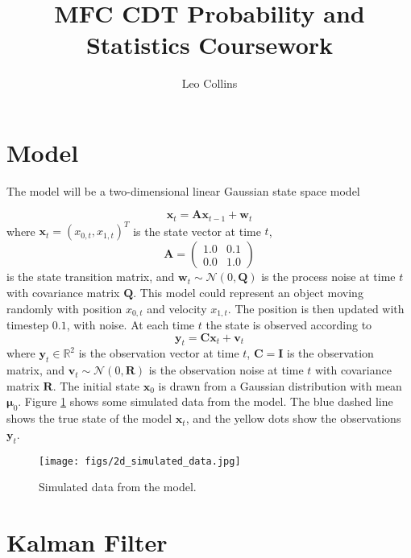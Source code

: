 \documentclass[12pt]{article}
\title{MFC CDT Probability and Statistics Coursework}
\author{Leo Collins}
\begin{document}
\maketitle

\section{Model}

The model will be a two-dimensional linear Gaussian state space model

\begin{equation}
    \mathbf{x}_{t} = \mathbf{A} \mathbf{x}_{t-1} + \mathbf{w}_{t}
\end{equation}
where $\mathbf{x}_{t}=(x_{0,t}, x_{1,t})^T$ is the state vector at time $t$, $$\mathbf{A}=\begin{pmatrix}
    1.0 & 0.1 \\
    0.0 & 1.0
\end{pmatrix}$$ is the state transition matrix, and $\mathbf{w}_{t} \sim \mathcal{N}(0, \mathbf{Q})$ is the process noise at time $t$ with covariance matrix $\mathbf{Q}$.
This model could represent an object moving randomly with position $x_{0,t}$ and velocity $x_{1,t}$. The position is then updated with timestep $0.1$, with noise.
At each time $t$ the state is observed according to
\begin{equation}
    \mathbf{y}_{t} = \mathbf{C} \mathbf{x}_{t} + \mathbf{v}_{t}
\end{equation}
where $\mathbf{y}_{t} \in \mathbb{R}^{2}$ is the observation vector at time $t$, $\mathbf{C}=\mathbf{I}$ is the observation matrix, and $\mathbf{v}_{t} \sim \mathcal{N}(0, \mathbf{R})$ is the observation noise at time $t$ with covariance matrix $\mathbf{R}$.
The initial state $\mathbf{x}_{0}$ is drawn from a Gaussian distribution with mean $\mathbf{\mu}_{0}$.
Figure \ref{fig:model_simulated} shows some simulated data from the model. The blue dashed line shows the true state of the model $\mathbf{x}_{t}$, and the yellow dots show the observations $\mathbf{y}_{t}$.

\begin{figure}[H]
    \centering
    \texttt{[image: figs/2d\_simulated\_data.jpg]}
    \caption{Simulated data from the model.}
    \label{fig:model_simulated}
\end{figure}

\section{Kalman Filter}
\end{document}

